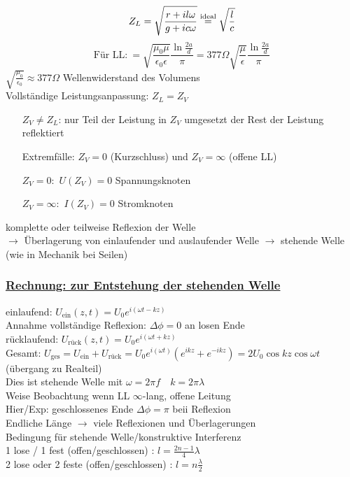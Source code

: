 \documentclass[titlepage,12pt,a4paper,ngerman]{report}
\newcommand{\tx}[1]{\textrm{#1}}
\begin{document}

$$Z_L = \sqrt{\frac{r + i l\omega}{g + i c \omega}} \buildrel \tx{ideal} \over = \sqrt{\frac{l}{c}}$$
$$ \tx{Für LL:} \ = \sqrt{\frac{\mu_0 \mu}{\epsilon_0 \epsilon}} \frac{\ln\frac{2a}{d}}{\pi} = 377 \Omega \sqrt{\frac{\mu}{\epsilon}} \frac{\ln\frac{2a}{d}}{\pi}$$
$ \sqrt{\frac{\mu_0}{\epsilon_0}} \approx 377 \Omega $ Wellenwiderstand des Volumens\\[5pt]
Vollständige Leistungsanpassung: $ Z_L = Z_V $
\begin{itemize}
	\item[$ Z_V \neq Z_L $:] nur Teil der Leistung in $ Z_V $ umgesetzt der Rest der Leistung reflektiert
	\item[Extremfälle:] $ Z_V = 0 $ (Kurzschluss) und $ Z_V = \infty $ (offene LL)
	\item[$ Z_V = 0: $] $ U(Z_V) = 0 $ Spannungsknoten
	\item[$ Z_V = \infty: $] $ I(Z_V) = 0 $ Stromknoten
\end{itemize}
komplette oder teilweise Reflexion der Welle\\
$ \rightarrow $ Überlagerung von einlaufender und auslaufender Welle
$ \rightarrow $ stehende Welle (wie in Mechanik bei Seilen)
\subsubsection{\underline{Rechnung: zur Entstehung der stehenden Welle}}
einlaufend: $ U_{\tx{ein}}(z,t) = U_0 e^{i(\omega t - kz)} $\\
Annahme vollständige Reflexion: $ \Delta \phi = 0 $ an losen Ende\\
rücklaufend: $ U_{\tx{rück}} (z,t) = U_0 e^{i(\omega t + kz)} $\\
Gesamt: $ U_{\tx{ges}} = U_{\tx{ein}} + U_{\tx{rück}} = U_0 e^{i(\omega t)} (e^{ikz} + e^{-ikz}) = 2 U_0 \cos kz \cos \omega t $ (übergang zu Realteil)\\
Dies ist stehende Welle mit $ \omega = 2 \pi f \quad k = 2 \pi \lambda $\\
Weise Beobachtung wenn LL $ \infty $-lang, offene Leitung\\
Hier/Exp: geschlossenes Ende $ \Delta \phi = \pi $ beii Reflexion\\
Endliche Länge $ \rightarrow $ viele Reflexionen und Überlagerungen\\
Bedingung für stehende Welle/konstruktive Interferenz\\
1 lose / 1 fest (offen/geschlossen) : $ l = \frac{2n-1}{4} \lambda $\\
2 lose oder 2 feste (offen/geschlossen) : $ l = n \frac{\lambda}{2} $
\end{document}
